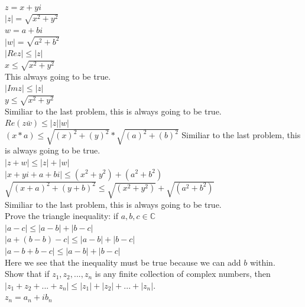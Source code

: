 \documentclass[12pt]{article}
\begin{document}
\\

$z = x + yi$\\
$|z| = \sqrt{x^2 + y^2}$\\
$w = a + bi$\\
$|w| = \sqrt{a^2 + b^2}$\\


 $|Re z| \leq |z|$\\

$x \leq \sqrt{x^2 + y^2}$\\
This always going to be true.\\


 $|Im z| \leq |z|$\\
$y \leq \sqrt{x^2 + y^2}$\\
Similiar to the last problem, this is always going to be true.\\


 $Re(z\bar{w}) \leq |z||w|$\\
$(x*a) \leq \sqrt{(x)^2 + (y)^2}*\sqrt{(a)^2 + (b)^2}$
Similiar to the last problem, this is always going to be true.\\


 $|z + w| \leq |z|+|w|$\\
$|x + yi + a + bi| \leq (x^2 + y^2) + (a^2 + b^2)$\\
$\sqrt{(x+a)^2 + (y+b)^2} \leq \sqrt{(x^2 + y^2)} + \sqrt{(a^2 + b^2)}$\\
Similiar to the last problem, this is always going to be true.\\

 Prove the triangle inequality: if $a,b,c \in \mathbb{C}$\\
$|a - c| \leq |a - b| + |b - c|$\\
$|a + (b - b) - c| \leq |a - b| + |b - c|$\\
$|a - b + b - c| \leq |a - b| + |b - c|$\\
Here we see that the inequality must be true because we can add $b$ within.\\


 Show that if $z_1,z_2,...,z_n$ is any finite collection of complex numbers, then\\
$|z_1 + z_2 + ... + z_n| \leq |z_1| + |z_2| + ... + |z_n|$.\\

$z_n = a_n + ib_n$\\
\end{document}
